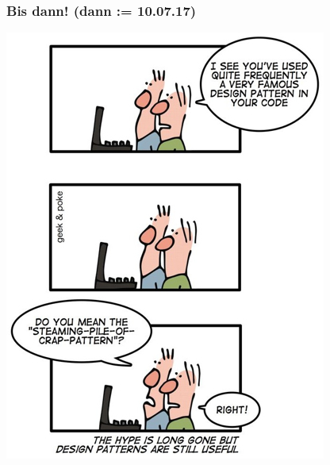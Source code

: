 \documentclass[18pt]{beamer}
\begin{document}
	\begin{frame}
		\frametitle{Bis dann! (dann  := 10.07.17)}
		\centering
		\includegraphics[scale=0.4]{./comics/patterns.jpg}
	\end{frame}
\end{document}
